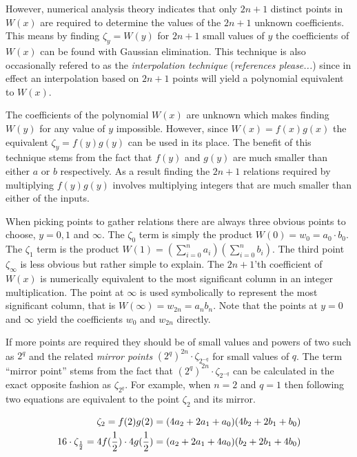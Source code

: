 \documentclass[b5paper]{book}
\begin{document}
However, numerical analysis theory indicates that only $2n + 1$ distinct points in $W(x)$ are required to determine the values of the $2n + 1$ unknown 
coefficients.   This means by finding $\zeta_y = W(y)$ for $2n + 1$ small values of $y$ the coefficients of $W(x)$ can be found with 
Gaussian elimination.  This technique is also occasionally refered to as the \textit{interpolation technique} (\textit{references please...}) since in 
effect an interpolation based on $2n + 1$ points will yield a polynomial equivalent to $W(x)$.  

The coefficients of the polynomial $W(x)$ are unknown which makes finding $W(y)$ for any value of $y$ impossible.  However, since 
$W(x) = f(x)g(x)$ the equivalent $\zeta_y = f(y) g(y)$ can be used in its place.  The benefit of this technique stems from the 
fact that $f(y)$ and $g(y)$ are much smaller than either $a$ or $b$ respectively.  As a result finding the $2n + 1$ relations required 
by multiplying $f(y)g(y)$ involves multiplying integers that are much smaller than either of the inputs.

When picking points to gather relations there are always three obvious points to choose, $y = 0, 1$ and $ \infty$.  The $\zeta_0$ term
is simply the product $W(0) = w_0 = a_0 \cdot b_0$.  The $\zeta_1$ term is the product 
$W(1) = \left (\sum_{i = 0}^{n} a_i \right ) \left (\sum_{i = 0}^{n} b_i \right )$.  The third point $\zeta_{\infty}$ is less obvious but rather
simple to explain.  The $2n + 1$'th coefficient of $W(x)$ is numerically equivalent to the most significant column in an integer multiplication.  
The point at $\infty$ is used symbolically to represent the most significant column, that is $W(\infty) = w_{2n} = a_nb_n$.  Note that the 
points at $y = 0$ and $\infty$ yield the coefficients $w_0$ and $w_{2n}$ directly.

If more points are required they should be of small values and powers of two such as $2^q$ and the related \textit{mirror points} 
$\left (2^q \right )^{2n}  \cdot \zeta_{2^{-q}}$ for small values of $q$.  The term ``mirror point'' stems from the fact that 
$\left (2^q \right )^{2n}  \cdot \zeta_{2^{-q}}$ can be calculated in the exact opposite fashion as $\zeta_{2^q}$.  For
example, when $n = 2$ and $q = 1$ then following two equations are equivalent to the point $\zeta_{2}$ and its mirror.

\begin{eqnarray}
\zeta_{2}                  = f(2)g(2) = (4a_2 + 2a_1 + a_0)(4b_2 + 2b_1 + b_0) \nonumber \\
16 \cdot \zeta_{1 \over 2} = 4f({1\over 2}) \cdot 4g({1 \over 2}) = (a_2 + 2a_1 + 4a_0)(b_2 + 2b_1 + 4b_0)
\end{eqnarray}
\end{document}
